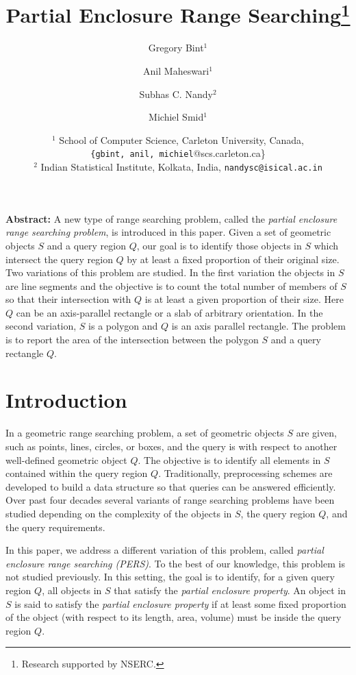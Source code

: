 \documentclass[a4paper,11pt]{article}
\title{Partial Enclosure Range Searching\thanks{Research supported by NSERC.}}
\author{Gregory Bint$^1$ \and Anil Maheswari$^1$ \and
        Subhas C. Nandy$^2$ 
        \and Michiel Smid$^1$ }
\date{$^1$ School of Computer Science, Carleton University, Canada, \\{\tt \{gbint,
anil, michiel}@scs.carleton.ca\}\\
$^2$ Indian Statistical Institute, Kolkata, India,
{\tt  nandysc@isical.ac.in}}
\newcommand{\PERS}[0]{PERS}
\begin{document}
\maketitle

{\bf Abstract:}
A new type of range searching problem, called the \emph{partial 
enclosure range searching problem}, is introduced in this paper. 
Given a set of geometric objects $S$ and a query region $Q$, our 
goal is to identify those objects in $S$ which intersect the 
query region $Q$ by at least a fixed proportion of their original 
size. Two variations of this problem are studied. In the first 
variation the objects in $S$ are line segments and the objective 
is to count the total number of members of $S$ so that their 
intersection with $Q$ is at least a given proportion of their size. 
Here $Q$ can be an axis-parallel rectangle or a slab of arbitrary 
orientation. In the second variation, $S$ is a polygon and $Q$ is 
an axis parallel rectangle. 
The problem is to report the area of the intersection between the 
polygon $S$ and a query rectangle $Q$. 


\section{Introduction}
In a geometric range searching problem, a set of geometric objects 
$S$ are given, such as points, lines, circles, 
or boxes, and the query is with respect to another well-defined 
geometric object $Q$. The objective is to identify all 
elements in $S$ contained within the query region $Q$. 
Traditionally, preprocessing schemes are developed to build a data 
structure so that queries can be answered efficiently. Over past four decades 
several variants of range searching problems have been studied depending 
on the complexity of the objects in $S$, the 
query region $Q$, and the query requirements. 

In this paper, we address a different variation of this problem, 
called \emph{partial enclosure range searching (\PERS{})}. To the 
best of our knowledge, this problem is not studied previously. In 
this setting, the goal is to identify, for a given query region 
$Q$, all objects in $S$ that satisfy the \emph{partial enclosure 
property}. An object in $S$ is said to satisfy the \emph{partial 
enclosure property} if at least some fixed proportion of the object
(with respect to its length, area, volume) must be inside the query 
region $Q$. 
\end{document}

